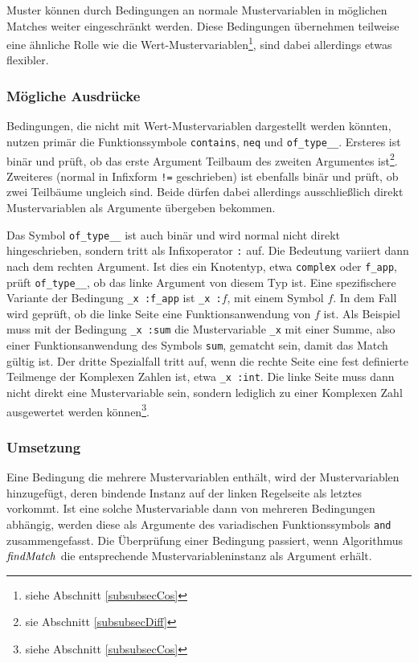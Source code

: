 Muster können durch Bedingungen an normale Mustervariablen in möglichen Matches weiter eingeschränkt werden.
Diese Bedingungen übernehmen teilweise eine ähnliche Rolle wie die Wert-Mustervariablen\footnote{siehe Abschnitt \ref{subsubsecCos}}, sind dabei allerdings etwas flexibler. 


\subsubsection{Mögliche Ausdrücke}
Bedingungen, die nicht mit Wert-Mustervariablen dargestellt werden könnten, nutzen primär die Funktionssymbole \verb|contains|, \verb|neq| und \verb|of_type__|. Ersteres ist binär und prüft, ob das erste Argument Teilbaum des zweiten Argumentes ist\footnote{sie Abschnitt \ref{subsubsecDiff}}. Zweiteres (normal in Infixform \verb|!=| geschrieben) ist ebenfalls binär und prüft, ob zwei Teilbäume ungleich sind. Beide dürfen dabei allerdings ausschließlich direkt Mustervariablen als Argumente übergeben bekommen. 

Das Symbol \verb|of_type__| ist auch binär und wird normal nicht direkt hingeschrieben, sondern tritt als Infixoperator \verb|:| auf. Die Bedeutung variiert dann nach dem rechten Argument. Ist dies ein Knotentyp, etwa \verb|complex| oder \verb|f_app|, prüft \verb|of_type__|, ob das linke Argument von diesem Typ ist. Eine spezifischere Variante der Bedingung \verb|_x :f_app| ist {\verb|_x :|$f$}, mit einem Symbol $f$. In dem Fall wird geprüft, ob die linke Seite eine Funktionsanwendung von $f$ ist. Als Beispiel muss mit der Bedingung \verb|_x :sum| die Mustervariable \verb|_x| mit einer Summe, also einer Funktionsanwendung des Symbols \verb|sum|, gematcht sein, damit das Match gültig ist.
Der dritte Spezialfall tritt auf, wenn die rechte Seite eine fest definierte Teilmenge der Komplexen Zahlen ist, etwa \verb|_x :int|. Die linke Seite muss dann nicht direkt eine Mustervariable sein, sondern lediglich zu einer Komplexen Zahl ausgewertet werden können\footnote{siehe Abschnitt \ref{subsubsecCos}}.

\subsubsection{Umsetzung}
Eine Bedingung die mehrere Mustervariablen enthält, wird der Mustervariablen hinzugefügt, deren bindende Instanz auf der linken Regelseite als letztes vorkommt. Ist eine solche Mustervariable dann von mehreren Bedingungen abhängig, werden diese als Argumente des variadischen Funktionssymbols \verb|and| zusammengefasst. Die Überprüfung einer Bedingung passiert, wenn Algorithmus $\mathit{findMatch}$ die entsprechende Mustervariableninstanz als Argument erhält. 






